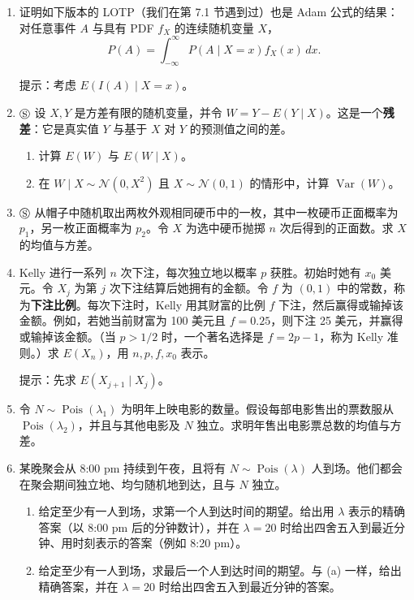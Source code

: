 \documentclass[UTF8, 12pt, fontset=fandol, oneside]{ctexart}
\begin{document}
\begin{enumerate}
\begin{enumerate}
    \noindent 提示：令 $X=YI_A$，然后写出 $X$ 的 PMF。

    \item[(c)] 用 (b) 简短证明
    \[
      E(Y)=E(Y\mid A)P(A)+E(Y\mid A^c)P(A^c).
    \]
  \end{enumerate}

  \item 证明如下版本的 LOTP（我们在第 7.1 节遇到过）也是 Adam 公式的结果：对任意事件 $A$ 与具有 PDF $f_X$ 的连续随机变量 $X$，
  \[
    P(A)=\int_{-\infty}^{\infty}P(A\mid X=x)f_X(x)\,dx.
  \]

  \noindent 提示：考虑 $E(I(A)\mid X=x)$。

  \item $\circledS$ 设 $X,Y$ 是方差有限的随机变量，并令 $W=Y-E(Y\mid X)$。这是一个\textbf{残差}：它是真实值 $Y$ 与基于 $X$ 对 $Y$ 的预测值之间的差。
  \begin{enumerate}
    \item[(a)] 计算 $E(W)$ 与 $E(W\mid X)$。
    \item[(b)] 在 $W\mid X\sim\mathcal N(0,X^2)$ 且 $X\sim\mathcal N(0,1)$ 的情形中，计算 $\operatorname{Var}(W)$。
  \end{enumerate}

  \item $\circledS$ 从帽子中随机取出两枚外观相同硬币中的一枚，其中一枚硬币正面概率为 $p_1$，另一枚正面概率为 $p_2$。令 $X$ 为选中硬币抛掷 $n$ 次后得到的正面数。求 $X$ 的均值与方差。

  \item Kelly 进行一系列 $n$ 次下注，每次独立地以概率 $p$ 获胜。初始时她有 $x_0$ 美元。令 $X_j$ 为第 $j$ 次下注结算后她拥有的金额。令 $f$ 为 $(0,1)$ 中的常数，称为\textbf{下注比例}。每次下注时，Kelly 用其财富的比例 $f$ 下注，然后赢得或输掉该金额。例如，若她当前财富为 100 美元且 $f=0.25$，则下注 25 美元，并赢得或输掉该金额。（当 $p>1/2$ 时，一个著名选择是 $f=2p-1$，称为 Kelly 准则。）求 $E(X_n)$，用 $n,p,f,x_0$ 表示。

  \noindent 提示：先求 $E(X_{j+1}\mid X_j)$。

  \item 令 $N\sim\operatorname{Pois}(\lambda_1)$ 为明年上映电影的数量。假设每部电影售出的票数服从 $\operatorname{Pois}(\lambda_2)$，并且与其他电影及 $N$ 独立。求明年售出电影票总数的均值与方差。

  \item 某晚聚会从 8:00 pm 持续到午夜，且将有 $N\sim\operatorname{Pois}(\lambda)$ 人到场。他们都会在聚会期间独立地、均匀随机地到达，且与 $N$ 独立。
  \begin{enumerate}
    \item[(a)] 给定至少有一人到场，求第一个人到达时间的期望。给出用 $\lambda$ 表示的精确答案（以 8:00 pm 后的分钟数计），并在 $\lambda=20$ 时给出四舍五入到最近分钟、用时刻表示的答案（例如 8:20 pm）。
    \item[(b)] 给定至少有一人到场，求最后一个人到达时间的期望。与 (a) 一样，给出精确答案，并在 $\lambda=20$ 时给出四舍五入到最近分钟的答案。
  \end{enumerate}


\end{enumerate}
\end{document}
